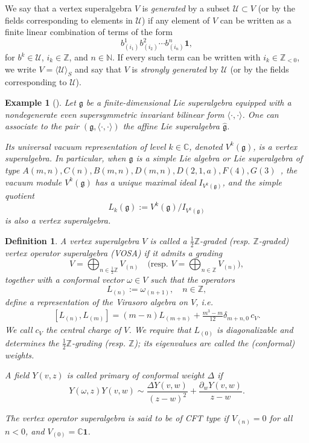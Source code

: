 \documentclass[9pt]{amsart}
\newtheorem{definition}{Definition}[section]
\newtheorem{example}{Example}[section]
\begin{document}
We say that a vertex superalgebra \( V \) is \emph{generated} by a subset \( \mathcal{U} \subset V \) (or by the fields corresponding to elements in \( \mathcal{U} \)) if any element of \( V \) can be written as a finite linear combination of terms of the form
\[
b^{1}_{(i_1)} b^{2}_{(i_2)} \cdots b^{n}_{(i_n)} \mathbf{1},
\]
for \( b^k \in \mathcal{U} \), \( i_k \in \mathbb{Z} \), and \( n \in \mathbb{N} \).  
If every such term can be written with \( i_k \in \mathbb{Z}_{<0} \), we write \( V = \langle \mathcal{U} \rangle_S \) and say that \( V \) is \emph{strongly generated} by \( \mathcal{U} \) (or by the fields corresponding to \( \mathcal{U} \)).

\begin{example}[{\cite{kac1998vertex, zheng2017vertex}}] \label{aflie}
Let \( \mathfrak{g} \) be a finite-dimensional Lie superalgebra equipped with a nondegenerate even supersymmetric invariant bilinear form \( \langle \cdot, \cdot \rangle \). One can associate to the pair \( (\mathfrak{g}, \langle \cdot, \cdot \rangle) \) the affine Lie superalgebra \( \widehat{\mathfrak{g}} \).

Its universal vacuum representation of level \( k \in \mathbb{C} \), denoted \( V^k(\mathfrak{g}) \), is a vertex superalgebra. In particular, when \( \mathfrak{g} \) is a simple Lie algebra or Lie superalgebra of type \( A(m,n), C(n), B(m,n), D(m,n), D(2,1,a), F(4), G(3) \)~\cite{kac2001integrable}, the vacuum module \( V^k(\mathfrak{g}) \) has a unique maximal ideal \( I_{V^k(\mathfrak{g})} \), and the simple quotient
\[
L_k(\mathfrak{g}) := V^k(\mathfrak{g}) / I_{V^k(\mathfrak{g})}
\]
is also a vertex superalgebra.
\end{example}


\begin{definition}
A vertex superalgebra \( V \) is called a \( \frac{1}{2} \mathbb{Z} \)-graded (resp. \( \mathbb{Z} \)-graded) vertex operator superalgebra (VOSA) if it admits a grading
\[
V = \bigoplus_{n \in \frac{1}{2} \mathbb{Z}} V_{(n)} \quad \text{(resp. } V = \bigoplus_{n \in \mathbb{Z}} V_{(n)}),
\]
together with a conformal vector \( \omega \in V \) such that the operators
\[
L_{(n)} := \omega_{(n+1)}, \quad n \in \mathbb{Z},
\]
define a representation of the Virasoro algebra on \( V \), i.e.
\begin{align}\label{viro1}
[L_{(n)}, L_{(m)}] = (m - n) L_{(m + n)} + \frac{m^3 - m}{12} \delta_{m+n,0} \, c_V.
\end{align}
We call \( c_V \) the central charge of \( V \). We require that \( L_{(0)} \) is diagonalizable and determines the \( \frac{1}{2} \mathbb{Z} \)-grading (resp. \( \mathbb{Z} \)); its eigenvalues are called the (conformal) weights.

A field \( Y(v,z) \) is called \emph{primary of conformal weight \( \Delta \)} if
\[
Y(\omega,z)Y(v,w)\sim \frac{\Delta Y(v,w)}{(z-w)^2}+\frac{\partial_w Y(v,w)}{z-w}.\]





The vertex operator superalgebra is said to be of \emph{CFT type} if \( V_{(n)} = 0 \) for all \( n < 0 \), and \( V_{(0)} = \mathbb{C} \mathbf{1} \).
\end{definition}
\end{document}
